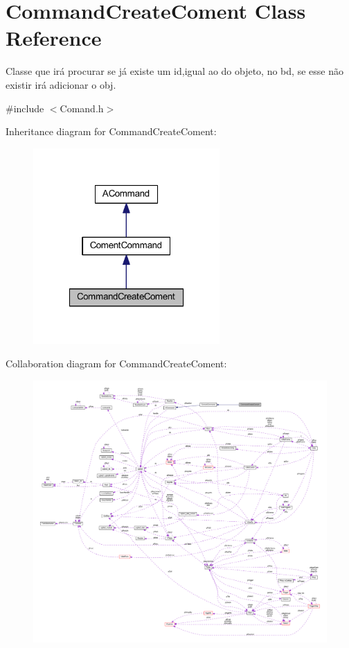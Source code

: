 \hypertarget{class_command_create_coment}{\section{Command\-Create\-Coment Class Reference}
\label{class_command_create_coment}
}


Classe que irá procurar se já existe um id,igual ao do objeto, no bd, se esse não existir irá adicionar o obj.  




{\ttfamily \#include $<$Comand.\-h$>$}



Inheritance diagram for Command\-Create\-Coment\-:\nopagebreak
\begin{figure}[H]
\begin{center}
\leavevmode
\includegraphics[width=202pt]{class_command_create_coment__inherit__graph}
\end{center}
\end{figure}


Collaboration diagram for Command\-Create\-Coment\-:\nopagebreak
\begin{figure}[H]
\begin{center}
\leavevmode
\includegraphics[width=350pt]{class_command_create_coment__coll__graph}
\end{center}
\end{figure}
